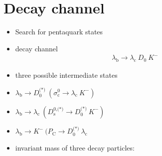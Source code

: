 \documentclass{beamer}
\begin{document}
\maketitle

\section{Decay channel}
\begin{frame}
\begin{itemize}
	\item Search for pentaquark states
	\item decay channel \begin{align}
	\lambda_{\textrm{b}} \rightarrow \lambda_{\textrm{c}} \ D_{\textrm{0}} \ K^{-}
	\end{align}
	\item three possible intermediate states
\end{itemize}
\end{frame}

\begin{frame}
\begin{itemize}
	\item $\lambda_{\textrm{b}} \rightarrow D_{\textrm{0}}^{\textrm{(*)}} \  (\sigma_{\textrm{c}}^{\textrm{0}} \rightarrow  \lambda_{\textrm{c}} \ K^{-})$
	\item $\lambda_{\textrm{b}} \rightarrow \lambda_{\textrm{c}} \ (D_{\textrm{s}}^{\textrm{0,(*)}} \rightarrow D_{\textrm{0}}^{\textrm{(*)}} \ K^{-})$
	\item $\lambda_{\textrm{b}} \rightarrow K^{-} \ (P_{\textrm{C}}\rightarrow D_{\textrm{0}}^{\textrm{(*)}} \ \lambda_{\textrm{c}}$
\end{itemize}
\end{frame}

\begin{frame}
\begin{itemize}
	\item invariant mass of three decay particles:
\end{itemize}
\end{frame}
\end{document}
